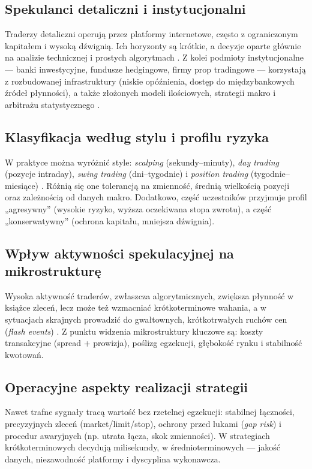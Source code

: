 \subsection{Spekulanci detaliczni i instytucjonalni}
Traderzy detaliczni operują przez platformy internetowe, często z ograniczonym kapitałem i wysoką dźwignią. Ich horyzonty są krótkie, a decyzje oparte głównie na analizie technicznej i prostych algorytmach \parencite{elder2014}. Z kolei podmioty instytucjonalne — banki inwestycyjne, fundusze hedgingowe, firmy prop tradingowe — korzystają z rozbudowanej infrastruktury (niskie opóźnienia, dostęp do międzybankowych źródeł płynności), a także złożonych modeli ilościowych, strategii makro i arbitrażu statystycznego \parencite{fabozzi2015,aldridge2013}.

\subsection{Klasyfikacja według stylu i profilu ryzyka}
W praktyce można wyróżnić style: \emph{scalping} (sekundy–minuty), \emph{day trading} (pozycje intraday), \emph{swing trading} (dni–tygodnie) i \emph{position trading} (tygodnie–miesiące) \parencite{murphy1999,hull2018}. Różnią się one tolerancją na zmienność, średnią wielkością pozycji oraz zależnością od danych makro. Dodatkowo, część uczestników przyjmuje profil „agresywny” (wysokie ryzyko, wyższa oczekiwana stopa zwrotu), a część „konserwatywny” (ochrona kapitału, mniejsza dźwignia).

\subsection{Wpływ aktywności spekulacyjnej na mikrostrukturę}
Wysoka aktywność traderów, zwłaszcza algorytmicznych, zwiększa płynność w książce zleceń, lecz może też wzmacniać krótkoterminowe wahania, a w sytuacjach skrajnych prowadzić do gwałtownych, krótkotrwałych ruchów cen (\emph{flash events}) \parencite{aldridge2013}. Z punktu widzenia mikrostruktury kluczowe są: koszty transakcyjne (spread + prowizja), poślizg egzekucji, głębokość rynku i stabilność kwotowań.

\subsection{Operacyjne aspekty realizacji strategii}
Nawet trafne sygnały tracą wartość bez rzetelnej egzekucji: stabilnej łączności, precyzyjnych zleceń (market/limit/stop), ochrony przed lukami (\emph{gap risk}) i procedur awaryjnych (np. utrata łącza, skok zmienności). W strategiach krótkoterminowych decydują milisekundy, w średnioterminowych — jakość danych, niezawodność platformy i dyscyplina wykonawcza.

